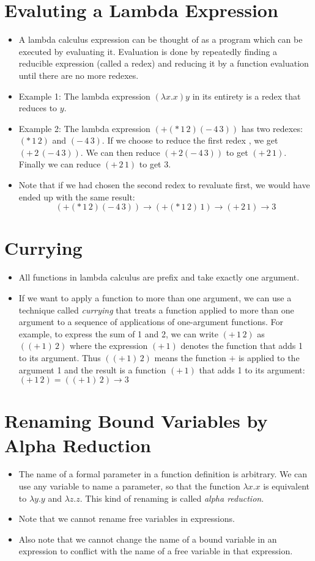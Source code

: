 \documentclass[]{article}
\begin{document}
\section{Evaluting a Lambda Expression}
\begin{itemize}
\item A lambda calculus expression can be thought of as a program which can be
executed by evaluating it. Evaluation is done by repeatedly finding a reducible
expression (called a redex) and reducing it by a function evaluation until there
are no more redexes.
\item Example 1: The lambda expression $(\lambda x.x)y$ in its entirety is a
redex that reduces to $y$.
\item Example 2: The lambda expression $(+(*\,1\,2)(-\,4\,3))$ has two redexes:
$(*\,1\,2)$ and $(-\,4\,3)$. If we choose to reduce the first redex , we get
$(+\,2\,(-\,4\,3))$. We can then reduce $(+\,2(-\,4\,3))$ to get $(+\,2\,1)$.
Finally we can reduce $(+\,2\,1)$ to get 3.
\item Note that if we had chosen the second redex to revaluate first, we would
have ended up with the same result:
\[
(+(*\,1\,2)(-\,4\,3))\rightarrow(+(*\,1\,2)\,1)\rightarrow(+\,2\,1)\rightarrow 3
\]
\end{itemize}

\section{Currying}
\begin{itemize}
\item All functions in lambda calculus are prefix and take exactly one argument.
\item If we want to apply a function to more than one argument, we can use a
technique called \emph{currying} that treats a function applied to more than one
argument to a sequence of applications of one-argument functions. For example,
to express the sum of 1 and 2, we can write $(+\,1\,2)$ as $((+\,1)\,2)$ where
the expression $(+\,1)$ denotes the function that adds 1 to its argument. Thus
$((+\,1)\,2)$ means the function $+$ is applied to the argument 1 and the result
is a function $(+\,1)$ that adds 1 to its argument:
$(+\,1\,2)=((+\,1)\,2)\rightarrow 3$
\end{itemize}

\section{Renaming Bound Variables by Alpha Reduction}
\begin{itemize}
\item The name of a formal parameter in a function definition is arbitrary. We
can use any variable to name a parameter, so that the function $\lambda x.x$ is
equivalent to $\lambda y.y$ and $\lambda z.z$. This kind of renaming is called
\emph{alpha reduction}.
\item Note that we cannot rename free variables in expressions.
\item Also note that we cannot change the name of a bound variable in an
expression to conflict with the name of a free variable in that expression.
\end{itemize}
\end{document}
